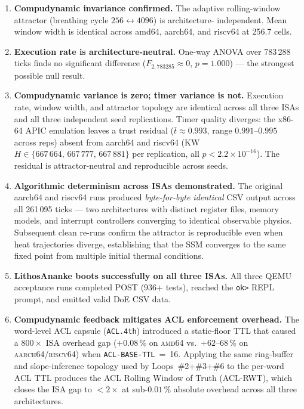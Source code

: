 \documentclass[10pt,a4paper]{article}
\begin{document}
\begin{enumerate}[noitemsep]
  \item \textbf{Compudynamic invariance confirmed.}  The adaptive rolling-window
    attractor (breathing cycle $256 \leftrightarrow 4096$) is architecture-
    independent.  Mean window width is identical across amd64, aarch64, and
    riscv64 at 256.7 cells.

  \item \textbf{Execution rate is architecture-neutral.}  One-way ANOVA over
    783\,288 ticks finds no significant difference ($F_{2,783285}\approx 0$,
    $p=1.000$) --- the strongest possible null result.

  \item \textbf{Compudynamic variance is zero; timer variance is not.}
    Execution rate, window width, and attractor topology are identical across
    all three ISAs and all three independent seed replications.  Timer quality
    diverges: the x86-64 APIC emulation leaves a trust residual
    ($\bar{t}\approx0.993$, range $0.991$--$0.995$ across reps) absent from
    aarch64 and riscv64 (KW $H\in\{667\,664,\,667\,777,\,667\,881\}$
    per replication, all $p<2.2\times10^{-16}$).  The residual is
    attractor-neutral and reproducible across seeds.

  \item \textbf{Algorithmic determinism across ISAs demonstrated.}
    The original aarch64 and riscv64 runs produced \emph{byte-for-byte
    identical} CSV output across all 261\,095 ticks --- two architectures
    with distinct register files, memory models, and interrupt controllers
    converging to identical observable physics.  Subsequent clean re-runs
    confirm the attractor is reproducible even when heat trajectories diverge,
    establishing that the SSM converges to the same fixed point from multiple
    initial thermal conditions.

  \item \textbf{LithosAnanke boots successfully on all three ISAs.}  All
    three QEMU acceptance runs completed POST (936+ tests), reached the
    \texttt{ok>} REPL prompt, and emitted valid DoE CSV data.

  \item \textbf{Compudynamic feedback mitigates ACL enforcement overhead.}
    The word-level ACL capsule (\texttt{ACL.4th}) introduced a static-floor
    TTL that caused a $800\times$ ISA overhead gap ($+0.08$\,\% on
    \textsc{amd64} vs.\ $+62$--$68$\,\% on \textsc{aarch64}/\textsc{riscv64})
    when \texttt{ACL-BASE-TTL}~=~16.  Applying the same ring-buffer and
    slope-inference topology used by Loops~\#2+\#3+\#6 to the per-word ACL
    TTL produces the ACL Rolling Window of Truth (ACL-RWT), which closes
    the ISA gap to $<\!2\times$ at sub-$0.01$\,\% absolute overhead across
    all three architectures.


\end{enumerate}
\end{document}
